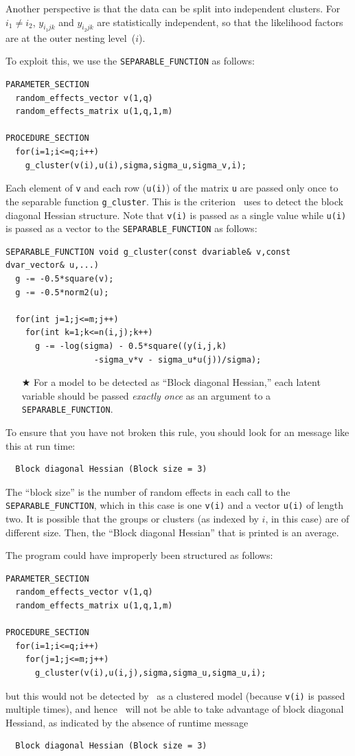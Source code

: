 \documentclass{admbmanual}
\begin{document}
Another perspective is that the data can be split into independent clusters. For
$i_1\neq i_2$, $y_{i_1jk}$ and $y_{i_2jk}$ are statistically independent, so
that the likelihood factors are at the outer nesting level~($i$).

To exploit this, we use the \texttt{SEPARABLE\_FUNCTION} as follows:
\begin{lstlisting}
PARAMETER_SECTION
  random_effects_vector v(1,q)
  random_effects_matrix u(1,q,1,m)

PROCEDURE_SECTION
  for(i=1;i<=q;i++)
    g_cluster(v(i),u(i),sigma,sigma_u,sigma_v,i);
\end{lstlisting}
Each element of \texttt{v} and each row (\texttt{u(i)}) of the matrix \texttt{u}
are passed only once to the separable function \texttt{g\_cluster}. This is the
criterion \scAB\ uses to detect the block diagonal Hessian structure. Note that
\texttt{v(i)} is passed as a single value while \texttt{u(i)} is passed as a
vector to the \texttt{SEPARABLE\_FUNCTION} as follows:
\begin{lstlisting}
SEPARABLE_FUNCTION void g_cluster(const dvariable& v,const dvar_vector& u,...)
  g -= -0.5*square(v);
  g -= -0.5*norm2(u);

  for(int j=1;j<=m;j++)
    for(int k=1;k<=n(i,j);k++)
      g -= -log(sigma) - 0.5*square((y(i,j,k)
                  -sigma_v*v - sigma_u*u(j))/sigma);
\end{lstlisting}
\begin{itemize}
  \item[$\bigstar$] For a model to be detected as ``Block diagonal Hessian,''
  each latent variable should be passed \textit{exactly once} as an argument to
  a \texttt{SEPARABLE\_FUNCTION}.
\end{itemize}
To ensure that you have not broken this rule, you should look for an message
like this at run time:
\begin{lstlisting}
  Block diagonal Hessian (Block size = 3)
\end{lstlisting}
The ``block size'' is the number of random effects in each call
to the \texttt{SEPARABLE\_FUNCTION}, which in this case is
one \texttt{v(i)} and a vector \texttt{u(i)} of length two.
It is possible that the groups or clusters (as indexed by $i$, in this case) are
of different size. Then, the ``Block diagonal Hessian'' that is printed is an
average.

The program could have improperly been structured as follows:
\begin{lstlisting}
PARAMETER_SECTION
  random_effects_vector v(1,q)
  random_effects_matrix u(1,q,1,m)

PROCEDURE_SECTION
  for(i=1;i<=q;i++)
    for(j=1;j<=m;j++)
      g_cluster(v(i),u(i,j),sigma,sigma_u,sigma_u,i);
\end{lstlisting}
but this would not be detected by \scAR\ as a clustered model (because
\texttt{v(i)} is passed multiple times), and hence \scAR\ will not be able to
take advantage of block diagonal Hessiand, as indicated by
the absence of runtime message
\begin{lstlisting}
  Block diagonal Hessian (Block size = 3)
\end{lstlisting}
\end{document}
